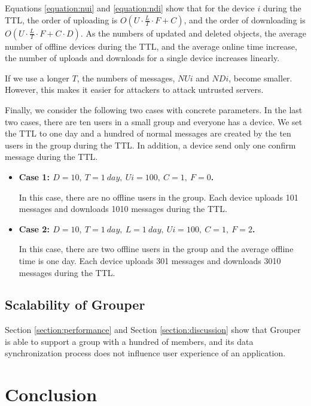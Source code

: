 \documentclass[a4paper,11pt]{report}
\begin{document}
Equations \ref{equation:nui} and \ref{equation:ndi} show that for the device $i$ during the TTL, the order of uploading is $O(U \cdot \frac{L}{T} \cdot F + C)$, and the order of downloading is $O(U \cdot \frac{L}{T} \cdot F + C \cdot D)$.
As the numbers of updated and deleted objects, the average number of offline devices during the TTL, and the average online time increase, the number of uploads and downloads for a single device increases linearly.

If we use a longer $T$, the numbers of messages, $NUi$ and $NDi$, become smaller.
However, this makes it easier for attackers to attack untrusted servers.

Finally, we consider the following two cases with concrete parameters.
In the last two cases, there are ten users in a small group and everyone has a device.
We set the TTL to one day and a hundred of normal messages are created by the ten users in the group during the TTL.
In addition, a device send only one confirm message during the TTL.

\begin{itemize}[leftmargin=7mm]
	\setlength{\itemsep}{1pt}
	\setlength{\parskip}{0pt}
	\setlength{\parsep}{0pt}
	\item \textbf{Case 1: $D = 10,\ T = 1 \ day,\ Ui = 100,\ C = 1,\ F = 0$.}
	
	In this case, there are no offline users in the group.
	Each device uploads 101 messages and downloads 1010 messages during the TTL.
	\item \textbf{Case 2: $D = 10,\ T = 1 \ day,\ L = 1 \  day,\ Ui = 100,\ C = 1,\ F = 2$.} 
	
	In this case, there are two offline users in the group and the average offline time is one day.
	Each device uploads 301 messages and downloads 3010 messages during the TTL.
\end{itemize}

\section{Scalability of Grouper} \label{section:grouper_scalability}

Section \ref{section:performance} and Section \ref{section:discussion} show that Grouper is able to support a group with a hundred of members, and its data synchronization process does not influence user experience of an application.

\chapter{Conclusion} \label{chapter:conclusion}
\end{document}
